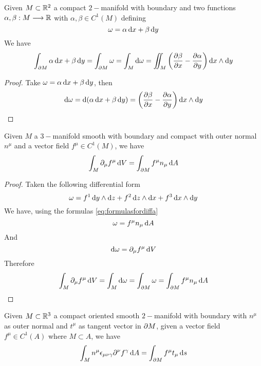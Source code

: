 \documentclass[../complete.tex]{subfiles}
\begin{document}
\begin{dfn}
	Given $M\subset\mathbb{R}^2$ a compact $2-$manifold with boundary and two functions $\alpha,\beta:M\overset{}{\longrightarrow}\mathbb{R}$ with $\alpha,\beta\in C^1(M)$ defining
	\begin{equation}
		\omega=\alpha\operatorname{d\!} x+\beta\operatorname{d\!} y
		\label{eq:ggman}
	\end{equation}
	We have
	\begin{equation}
		\int_{\partial M}\alpha\operatorname{d\!} x+\beta\operatorname{d\!} y=\int_{\partial M}\omega=\int_M\operatorname{d\!}\omega=\iint_M\left( \pdv{\beta}{x}-\pdv{\alpha}{y} \right)\operatorname{d\!} x\wedge\operatorname{d\!} y
		\label{eq:gaussgreendf}
	\end{equation}
\end{dfn}
\begin{proof}
	Take $\omega=\alpha\operatorname{d\!} x+\beta\operatorname{d\!} y$, then
	\begin{equation*}
		\operatorname{d\!}\omega=\operatorname{d\!}\left( \alpha\operatorname{d\!} x+\beta\operatorname{d\!} y \right)=\left( \pdv{\beta}{x}-\pdv{\alpha}{y} \right)\operatorname{d\!} x\wedge\operatorname{d\!} y
	\end{equation*}
\end{proof}
\begin{thm}
	Given $M$ a $3-$manifold smooth with boundary and compact with outer normal $n^\mu$ and a vector field $f^\mu\in C^1(M)$, we have
	\begin{equation}
		\int_M\partial_\mu f^\mu\operatorname{d\!} V=\int_{\partial M}f^\mu n_\mu\operatorname{d\!} A
		\label{eq:gaussdf}
	\end{equation}
\end{thm}
\begin{proof}
	Taken the following differential form
	\begin{equation*}
		\omega=f^1\operatorname{d\!} y\wedge\operatorname{d\!} z+f^2\operatorname{d\!} z\wedge\operatorname{d\!} x+f^3\operatorname{d\!} x\wedge\operatorname{d\!} y
	\end{equation*}
	We have, using the formulas \eqref{eq:formulasfordiffa}
	\begin{equation*}
		\omega=f^\mu n_\mu\operatorname{d\!} A
	\end{equation*}
	And
	\begin{equation*}
		\operatorname{d\!}\omega=\partial_\mu f^\mu\operatorname{d\!} V
	\end{equation*}
	Therefore
	\begin{equation*}
		\int_M\partial_\mu f^\mu\operatorname{d\!} V=\int_M\operatorname{d\!}\omega=\int_{\partial M}\omega=\int_{\partial M}f^\mu n_\mu\operatorname{d\!} A
	\end{equation*}
\end{proof}
\begin{thm}
	Given $M\subset\mathbb{R}^3$ a compact oriented smooth $2-$manifold with boundary with $n^\mu$ as outer normal and $t^\mu$ as tangent vector in $\partial M$, given a vector field $f^\mu\in C^1(A)$ where $M\subset A$, we have
	\begin{equation}
		\int_Mn^\mu\epsilon_{\mu\nu\gamma}\partial^\nu f^\gamma\operatorname{d\!} A=\int_{\partial M}f^\mu t_\mu\operatorname{d\!} s
		\label{eq:stokesrotordf}
	\end{equation}
\end{thm}
\end{document}
